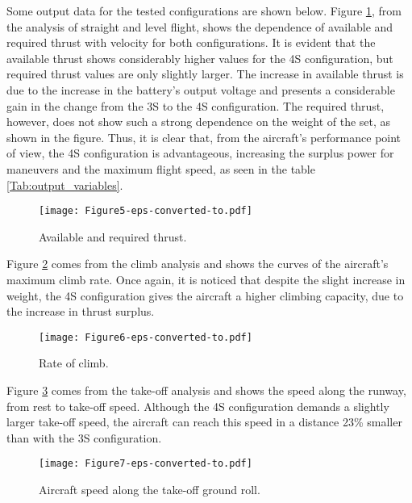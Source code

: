 \documentclass[10pt]{SelfArx} %
\begin{document}
Some output data for the tested configurations are shown below. Figure \ref{fig:nivelado}, from the analysis of straight and level flight, shows the dependence of  available and required thrust with velocity for both configurations. It is evident that the available thrust shows considerably higher values for the 4S configuration, but required thrust values are only slightly larger. The increase in available thrust is due to the increase in the battery's output voltage and presents a considerable gain in the change from the 3S to the 4S configuration. The required thrust, however, does not show such a strong dependence on the weight of the set, as shown in the figure. Thus, it is clear that, from the aircraft's performance point of view, the 4S configuration is advantageous, increasing the surplus power for maneuvers and the maximum flight speed, as seen in the table \ref{Tab:output_variables}.
\begin{figure}[htb]
	\begin{center}
	\texttt{[image: Figure5-eps-converted-to.pdf]}
	\caption{Available and required thrust.}
	\label{fig:nivelado}
	\end{center}
\end{figure}

Figure \ref{fig:subida} comes from the climb analysis and shows the curves of the aircraft's maximum climb rate. Once again, it is noticed that despite the slight increase in weight, the 4S configuration gives the aircraft  a higher climbing capacity, due to the increase in thrust surplus.
\begin{figure}[htb]
	\begin{center}
	\texttt{[image: Figure6-eps-converted-to.pdf]}
	\caption{Rate of climb.}
	\label{fig:subida}
	\end{center}
\end{figure}

Figure \ref{fig:decolagem} comes from the take-off analysis and shows the speed along the runway, from rest to take-off speed. Although the 4S configuration demands a slightly larger take-off speed, the aircraft can reach this speed in a distance 23\% smaller than with the 3S configuration.
\begin{figure}[htb]
	\begin{center}
	\texttt{[image: Figure7-eps-converted-to.pdf]}
	\caption{Aircraft speed along the take-off ground roll.}
	\label{fig:decolagem}
	\end{center}
\end{figure}
\end{document}
